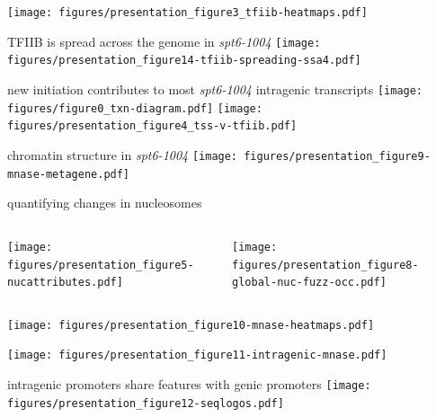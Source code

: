 \documentclass[aspectratio=169]{beamer}
\begin{document}
\begin{frame}
    \centering
    \texttt{[image: figures/presentation\_figure3\_tfiib-heatmaps.pdf]}
\end{frame}

\begin{frame}{TFIIB is spread across the genome in \textit{spt6-1004}}
\texttt{[image: figures/presentation\_figure14-tfiib-spreading-ssa4.pdf]}
\end{frame}

\begin{frame}{new initiation contributes to most \textit{spt6-1004} intragenic transcripts}
    \centering
    \texttt{[image: figures/figure0\_txn-diagram.pdf]}
    \texttt{[image: figures/presentation\_figure4\_tss-v-tfiib.pdf]}
\end{frame}

\begin{frame}{chromatin structure in \textit{spt6-1004}}
\texttt{[image: figures/presentation\_figure9-mnase-metagene.pdf]}
\end{frame}

\begin{frame}{quantifying changes in nucleosomes}
    \begin{columns}
        \begin{column}{0.5\textwidth}
            \centering
            \texttt{[image: figures/presentation\_figure5-nucattributes.pdf]}
        \end{column}
        \begin{column}{0.5\textwidth}
            \centering
            \pause
            \texttt{[image: figures/presentation\_figure8-global-nuc-fuzz-occ.pdf]}
        \end{column}
    \end{columns}
\end{frame}

\begin{frame}
\texttt{[image: figures/presentation\_figure10-mnase-heatmaps.pdf]}
\end{frame}

\begin{frame}
\texttt{[image: figures/presentation\_figure11-intragenic-mnase.pdf]}
\end{frame}

\begin{frame}{intragenic promoters share features with genic promoters}
    \texttt{[image: figures/presentation\_figure12-seqlogos.pdf]}
\end{frame}
\end{document}
